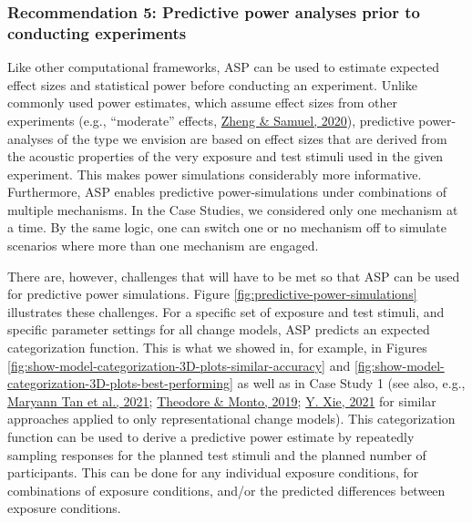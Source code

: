 \documentclass[
  11pt,
  english,
  man,floatsintext]{apa6}
\begin{document}
\hypertarget{recommendation-5-predictive-power-analyses-prior-to-conducting-experiments}{%
\subsubsection{Recommendation 5: Predictive power analyses prior to conducting experiments}\label{recommendation-5-predictive-power-analyses-prior-to-conducting-experiments}}

Like other computational frameworks, ASP can be used to estimate expected effect sizes and statistical power before conducting an experiment. Unlike commonly used power estimates, which assume effect sizes from other experiments (e.g., {``moderate''} effects, \protect\hyperlink{ref-zheng-samuel2020}{Zheng \& Samuel, 2020}), predictive power-analyses of the type we envision are based on effect sizes that are derived from the acoustic properties of the very exposure and test stimuli used in the given experiment. This makes power simulations considerably more informative. Furthermore, ASP enables predictive power-simulations under combinations of multiple mechanisms. In the Case Studies, we considered only one mechanism at a time. By the same logic, one can switch one or no mechanism off to simulate scenarios where more than one mechanism are engaged.

There are, however, challenges that will have to be met so that ASP can be used for predictive power simulations. Figure \ref{fig:predictive-power-simulations} illustrates these challenges. For a specific set of exposure and test stimuli, and specific parameter settings for all change models, ASP predicts an expected categorization function. This is what we showed in, for example, in Figures \ref{fig:show-model-categorization-3D-plots-similar-accuracy} and \ref{fig:show-model-categorization-3D-plots-best-performing} as well as in Case Study 1 (see also, e.g., \protect\hyperlink{ref-tan2021}{Maryann Tan et al., 2021}; \protect\hyperlink{ref-theodore-monto2019}{Theodore \& Monto, 2019}; \protect\hyperlink{ref-xie2021}{Y. Xie, 2021} for similar approaches applied to only representational change models). This categorization function can be used to derive a predictive power estimate by repeatedly sampling responses for the planned test stimuli and the planned number of participants. This can be done for any individual exposure conditions, for combinations of exposure conditions, and/or the predicted differences between exposure conditions.
\end{document}

